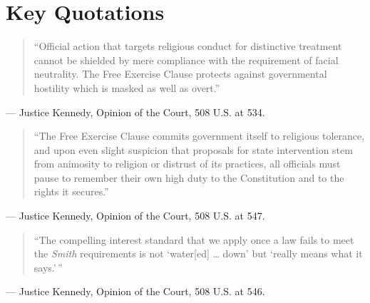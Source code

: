 \documentclass[12pt]{article}
\begin{document}
\section{Key Quotations}

\begin{quote}
``Official action that targets religious conduct for distinctive treatment cannot be shielded by mere compliance with the requirement of facial neutrality. The Free Exercise Clause protects against governmental hostility which is masked as well as overt.''
\end{quote}
\noindent --- Justice Kennedy, Opinion of the Court, 508 U.S. at 534.

\begin{quote}
``The Free Exercise Clause commits government itself to religious tolerance, and upon even slight suspicion that proposals for state intervention stem from animosity to religion or distrust of its practices, all officials must pause to remember their own high duty to the Constitution and to the rights it secures.''
\end{quote}
\noindent --- Justice Kennedy, Opinion of the Court, 508 U.S. at 547.

\begin{quote}
``The compelling interest standard that we apply once a law fails to meet the \textit{Smith} requirements is not `water[ed] \dots{} down' but `really means what it says.'\,''
\end{quote}
\noindent --- Justice Kennedy, Opinion of the Court, 508 U.S. at 546.
\end{document}
